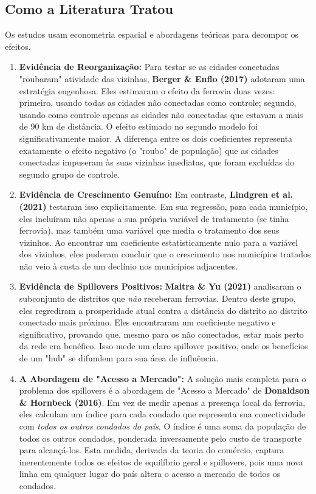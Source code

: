 \documentclass[12pt, a4paper]{article}
\begin{document}
\subsection{Como a Literatura Tratou}

Os estudos usam econometria espacial e abordagens teóricas para decompor os efeitos.

\begin{enumerate}[label=\arabic*.]
    \item \textbf{Evidência de Reorganização:} Para testar se as cidades conectadas "roubaram" atividade das vizinhas, \textbf{Berger \& Enflo (2017)} adotaram uma estratégia engenhosa. Eles estimaram o efeito da ferrovia duas vezes: primeiro, usando todas as cidades não conectadas como controle; segundo, usando como controle apenas as cidades não conectadas que estavam a mais de 90 km de distância. O efeito estimado no segundo modelo foi significativamente maior. A diferença entre os dois coeficientes representa exatamente o efeito negativo (o "roubo" de população) que as cidades conectadas impuseram às suas vizinhas imediatas, que foram excluídas do segundo grupo de controle.

    \item \textbf{Evidência de Crescimento Genuíno:} Em contraste, \textbf{Lindgren et al. (2021)} testaram isso explicitamente. Em sua regressão, para cada município, eles incluíram não apenas a sua própria variável de tratamento (se tinha ferrovia), mas também uma variável que media o tratamento dos seus vizinhos. Ao encontrar um coeficiente estatisticamente nulo para a variável dos vizinhos, eles puderam concluir que o crescimento nos municípios tratados não veio à custa de um declínio nos municípios adjacentes.

    \item \textbf{Evidência de Spillovers Positivos:} \textbf{Maitra \& Yu (2021)} analisaram o subconjunto de distritos que \textit{não} receberam ferrovias. Dentro deste grupo, eles regrediram a prosperidade atual contra a distância do distrito ao distrito conectado mais próximo. Eles encontraram um coeficiente negativo e significativo, provando que, mesmo para os não conectados, estar mais perto da rede era benéfico. Isso mede um claro spillover positivo, onde os benefícios de um "hub" se difundem para sua área de influência.
    
    \item \textbf{A Abordagem de "Acesso a Mercado":} A solução mais completa para o problema dos spillovers é a abordagem de "Acesso a Mercado" de \textbf{Donaldson \& Hornbeck (2016)}. Em vez de medir apenas a presença local da ferrovia, eles calculam um índice para cada condado que representa sua conectividade com \textit{todos os outros condados do país}. O índice é uma soma da população de todos os outros condados, ponderada inversamente pelo custo de transporte para alcançá-los. Esta medida, derivada da teoria do comércio, captura inerentemente todos os efeitos de equilíbrio geral e spillovers, pois uma nova linha em qualquer lugar do país altera o acesso a mercado de todos os condados.
\end{enumerate}
\end{document}
